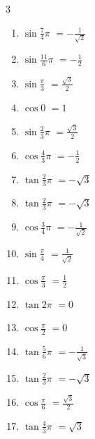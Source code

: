 \begin{multicols}{3}
\begin{enumerate}
  \item $\displaystyle \sin{\frac{7}{4}\pi}$
        $\displaystyle =-\frac{1}{\sqrt{2}}$

  \item $\displaystyle \sin{\frac{11}{6}\pi}$
        $\displaystyle =-\frac{1}{2}$

  \item $\displaystyle \sin{\frac{\pi}{3}}$
        $\displaystyle =\frac{\sqrt{3}}{2}$

  \item $\displaystyle \cos{0}$
        $\displaystyle =1$

  \item $\displaystyle \sin{\frac{2}{3}\pi}$
        $\displaystyle =\frac{\sqrt{3}}{2}$

  \item $\displaystyle \cos{\frac{4}{3}\pi}$
        $\displaystyle =-\frac{1}{2}$

  \item $\displaystyle \tan{\frac{2}{3}\pi}$
        $\displaystyle =-\sqrt{3}$

  \item $\displaystyle \tan{\frac{2}{3}\pi}$
        $\displaystyle =-\sqrt{3}$

  \item $\displaystyle \cos{\frac{3}{4}\pi}$
        $\displaystyle =-\frac{1}{\sqrt{2}}$

  \item $\displaystyle \sin{\frac{\pi}{4}}$
        $\displaystyle =\frac{1}{\sqrt{2}}$

  \item $\displaystyle \cos{\frac{\pi}{3}}$
        $\displaystyle =\frac{1}{2}$

  \item $\displaystyle \tan{2\pi}$
        $\displaystyle =0$

  \item $\displaystyle \cos{\frac{\pi}{2}}$
        $\displaystyle =0$

  \item $\displaystyle \tan{\frac{5}{6}\pi}$
        $\displaystyle =-\frac{1}{\sqrt{3}}$

  \item $\displaystyle \tan{\frac{2}{3}\pi}$
        $\displaystyle =-\sqrt{3}$

  \item $\displaystyle \cos{\frac{\pi}{6}}$
        $\displaystyle =\frac{\sqrt{3}}{2}$

  \item $\displaystyle \tan{\frac{4}{3}\pi}$
        $\displaystyle =\sqrt{3}$


\end{enumerate}
\end{multicols}

